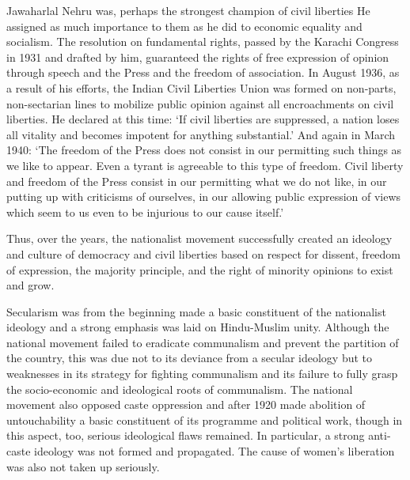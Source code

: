 \begin{multicols}{2}
Jawaharlal Nehru was, perhaps the strongest champion of civil liberties He assigned as much importance to them as he did to economic equality and socialism. The resolution on fundamental rights, passed by the Karachi Congress in 1931 and drafted by him, guaranteed the rights of free expression of opinion through speech and the Press and the freedom of association. In August 1936, as a result of his efforts, the Indian Civil Liberties Union was formed on non-parts, non-sectarian lines to mobilize public opinion against all encroachments on civil liberties. He declared at this time: `If civil liberties are suppressed, a nation loses all vitality and becomes impotent for anything substantial.' And again in March 1940: `The freedom of the Press does not consist in our permitting such things as we like to appear. Even a tyrant is agreeable to this type of freedom. Civil liberty and freedom of the Press consist in our permitting what we do not like, in our putting up with criticisms of ourselves, in our allowing public expression of views which seem to us even to be injurious to our cause itself.'

Thus, over the years, the nationalist movement successfully created an ideology and culture of democracy and civil liberties based on respect for dissent, freedom of expression, the majority principle, and the right of minority opinions to exist and grow.

Secularism was from the beginning made a basic constituent of the nationalist ideology and a strong emphasis was laid on Hindu-Muslim unity. Although the national movement failed to eradicate communalism and prevent the partition of the country, this was due not to its deviance from a secular ideology but to weaknesses in its strategy for fighting communalism and its failure to fully grasp the socio-economic and ideological roots of communalism. The national movement also opposed caste oppression and after 1920 made abolition of untouchability a basic constituent of its programme and political work, though in this aspect, too, serious ideological flaws remained. In particular, a strong anti-caste ideology was not formed and propagated. The cause of women's liberation was also not taken up seriously.


\end{multicols}
